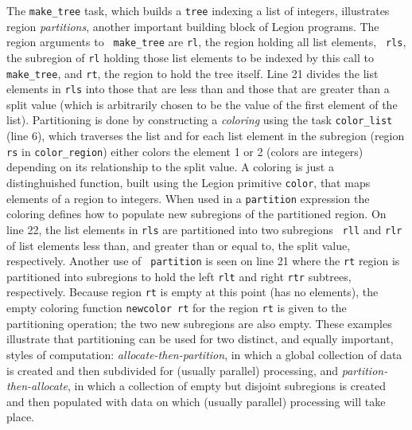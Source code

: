 The {\tt make\_tree} task, which builds a {\tt tree} indexing a list
of integers, illustrates region {\em partitions}, another important
building block of Legion programs.  The region arguments to {\tt
make\_tree} are {\tt rl}, the region holding all list elements, {\tt
rls}, the subregion of {\tt rl} holding those list elements to be
indexed by this call to {\tt make\_tree}, and {\tt rt}, the region to
hold the tree itself.  Line 21 divides the list elements in {\tt rls}
into those that are less than and those that are greater than a split
value (which is arbitrarily chosen to be the value of the first
element of the list).  Partitioning is done by constructing a {\em
coloring} using the task {\tt color\_list} (line 6), which traverses the list
and for each list element in the subregion (region {\tt rs} in
{\tt color\_region}) either colors the element 1 or 2 (colors are
integers) depending on its relationship to the split value.  A
coloring is just a distinghuished function, built using the Legion
primitive {\tt color}, that maps elements of a region to integers.
When used in a {\tt partition} expression the coloring defines how to
populate new subregions of the partitioned region.  On line 22, the
list elements in {\tt rls} are partitioned into two subregions {\tt
rll} and {\tt rlr} of list elements less than, and greater than or
equal to, the split value, respectively.  Another use of {\tt
partition} is seen on line 21 where the {\tt rt} region is partitioned
into subregions to hold the left {\tt rlt} and right {\tt rtr}
subtrees, respectively.  Because region {\tt rt} is empty at this
point (has no elements), the empty coloring function {\tt newcolor rt}
for the region {\tt rt} is given to the partitioning operation; the
two new subregions are also empty.  These examples illustrate that
partitioning can be used for two distinct, and equally important,
styles of computation: {\em allocate-then-partition}, in which a
global collection of data is created and then subdivided for
(usually parallel) processing, and {\em partition-then-allocate}, in
which a collection of empty but disjoint subregions is created and
then populated with data on which (usually parallel) processing will
take place.

